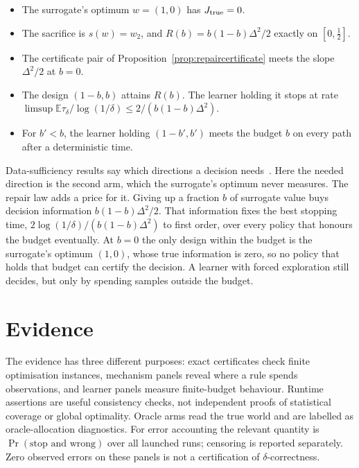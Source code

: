 \begin{proposition}
\label{prop:twoarm}
\begin{itemize}
\item The surrogate's optimum $w=(1,0)$ has $J_{\rm true}=0$.
\item The sacrifice is $s(w)=w_2$, and $R(b)=b(1-b)\Delta^2/2$ exactly on $[0,\frac12]$.
\item The certificate pair of Proposition~\ref{prop:repaircertificate} meets the slope
$\Delta^2/2$ at $b=0$.
\item The design $(1-b,b)$ attains $R(b)$. The learner holding it stops at rate
$\limsup\mathbb E\tau_\delta/\log(1/\delta)\le2/(b(1-b)\Delta^2)$.
\item For $b'<b$, the learner holding $(1-b',b')$ meets the budget $b$ on every path after a
deterministic time.
\end{itemize}
\end{proposition}

Data-sufficiency results say which directions a decision needs~\cite{bennouna2025}. Here the
needed direction is the second arm, which the surrogate's optimum never measures. The repair
law adds a price for it. Giving up a fraction $b$ of surrogate value buys decision information
$b(1-b)\Delta^2/2$. That information fixes the best stopping time,
$2\log(1/\delta)/(b(1-b)\Delta^2)$ to first order, over every policy that honours the budget
eventually. At $b=0$ the only design within the budget is the surrogate's optimum $(1,0)$, whose
true information is zero, so no policy that holds that budget can certify the decision. A
learner with forced exploration still decides, but only by spending samples outside the budget.

\section{Evidence}
\label{sec:evidence}

The evidence has three different purposes: exact certificates check finite optimisation
instances, mechanism panels reveal where a rule spends observations, and learner panels measure
finite-budget behaviour. Runtime assertions are useful consistency checks, not independent
proofs of statistical coverage or global optimality. Oracle arms read the true world and are
labelled as oracle-allocation diagnostics. For error accounting the relevant quantity is
$\Pr(\text{stop and wrong})$ over all launched runs; censoring is reported separately.
Zero observed errors on these panels is not a certification of $\delta$-correctness.

